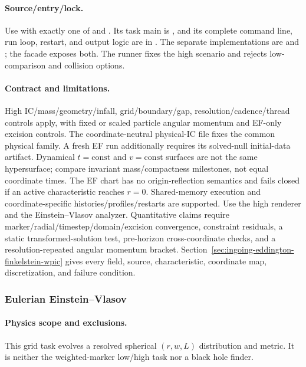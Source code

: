 \paragraph{Source/entry/lock.}
Use  with exactly one of
 and
.  Its task main is
, and its complete
command line, run loop, restart, and output logic are in
.  The separate implementations are
 and
; the facade
 exposes both.  The runner fixes the
high scenario and rejects low-comparison and collision options.
\paragraph{Contract and limitations.}
High IC/mass/geometry/infall, grid/boundary/gap, resolution/cadence/thread
controls apply, with fixed or scaled particle angular momentum and EF-only
excision controls.  The coordinate-neutral physical-IC file fixes the common
physical family.  A fresh EF run additionally requires its solved-null
initial-data artifact.  Dynamical \(t=\mathrm{const}\) and \(v=\mathrm{const}\) surfaces
are not the same hypersurface; compare invariant mass/compactness milestones,
not equal coordinate times.  The EF chart has no origin-reflection semantics
and fails closed if an active characteristic reaches \(r=0\).  Shared-memory
execution and coordinate-specific histories/profiles/restarts are supported.
Use the high renderer and the Einstein--Vlasov analyzer.  Quantitative claims require
marker/radial/timestep/domain/excision convergence, constraint residuals, a
static transformed-solution test, pre-horizon cross-coordinate checks, and a
resolution-repeated angular momentum bracket.
Section~\ref{sec:ingoing-eddington-finkelstein-wpic} gives every field,
source, characteristic, coordinate map, discretization, and failure condition.

\subsubsection{Eulerian Einstein--Vlasov}
\paragraph{Physics scope and exclusions.}
This grid task evolves a resolved spherical
\((r,w,L)\) distribution and metric.  It is neither the weighted-marker
low/high task nor a black hole finder.

